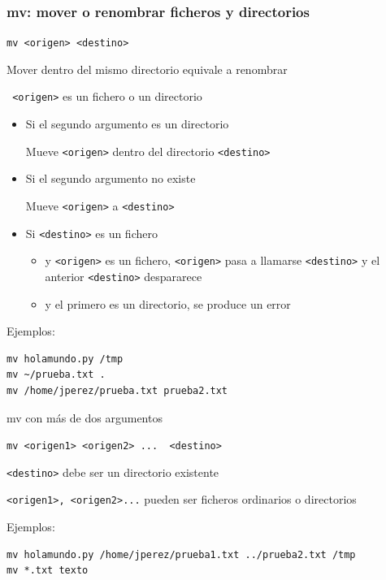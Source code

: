 \documentclass[ucs]{beamer}
\begin{document}
\begin{frame}[fragile]
\frametitle{mv: mover o renombrar ficheros y directorios }
      \verb|mv <origen> <destino>|

Mover dentro del mismo directorio equivale a renombrar

\verb| <origen>| es un fichero o un directorio

  \begin{itemize}
    \item Si el segundo argumento es un directorio

        Mueve \verb|<origen>| dentro del directorio \verb|<destino>| 


    \item Si el segundo argumento no existe 

        Mueve \verb|<origen>| a  \verb|<destino>| 


     \item Si \verb|<destino>| es un fichero
  \begin{itemize}
\item
y  \verb|<origen>| es un fichero, \verb|<origen>| pasa a llamarse
\verb|<destino>|
y el anterior
\verb|<destino>|
despararece
\item
y el primero es un directorio, se produce un error
  \end{itemize}


  \end{itemize}



Ejemplos:

  \begin{footnotesize}
  \begin{verbatim}
mv holamundo.py /tmp
mv ~/prueba.txt .
mv /home/jperez/prueba.txt prueba2.txt
  \end{verbatim}
  \end{footnotesize}

\end{frame}



\begin{frame}[fragile]

mv con más de dos argumentos

\verb|mv <origen1> <origen2> ...  <destino>|

\verb|<destino>|  debe ser un directorio existente

\verb|<origen1>, <origen2>...| pueden ser ficheros ordinarios o directorios


Ejemplos:
  \begin{footnotesize}
  \begin{verbatim}
mv holamundo.py /home/jperez/prueba1.txt ../prueba2.txt /tmp
mv *.txt texto
  \end{verbatim}
  \end{footnotesize}


\end{frame}
\end{document}
